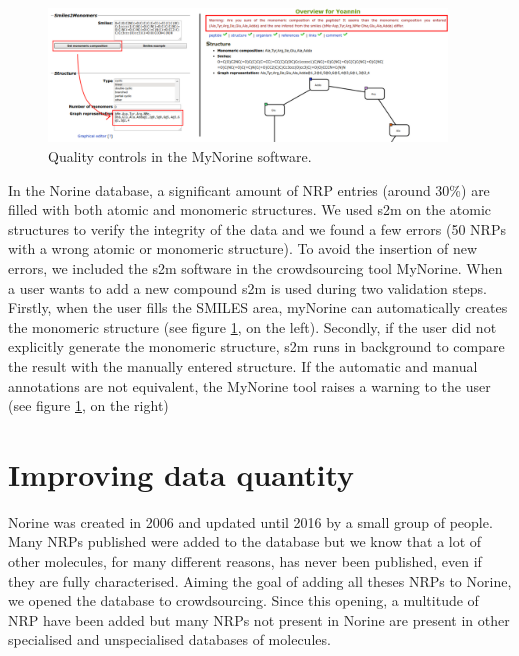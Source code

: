 \documentclass[long, final]{jobim2017}
\begin{document}
 \begin{figure}
   \begin{center}
     \includegraphics[width=400px]{figs/warnings.png}
   \end{center}
   \caption{Quality controls in the MyNorine software.}
   \label{fig:warnings}
 \end{figure}

In the Norine database, a significant amount of NRP entries (around 30\%) are filled with both atomic and monomeric structures.
We used s2m on the atomic structures to verify the integrity of the data and we found a few errors (50 NRPs with a wrong atomic or monomeric structure).
To avoid the insertion of new errors, we included the s2m software in the crowdsourcing tool MyNorine.
When a user wants to add a new compound s2m is used during two validation steps.
Firstly, when the user fills the SMILES area, myNorine can automatically creates the monomeric structure (see figure \ref{fig:warnings}, on the left).
Secondly, if the user did not explicitly generate the monomeric structure, s2m runs in background to compare the result with the manually entered structure.
If the automatic and manual annotations are not equivalent, the MyNorine tool raises a warning to the user (see figure \ref{fig:warnings}, on the right)


\section{Improving data quantity}

Norine was created in 2006 and updated until 2016 by a small group of people.
Many NRPs published were added to the database but we know that a lot of other molecules, for many different reasons, has never been published, even if they are fully characterised.
Aiming the goal of adding all theses NRPs to Norine, we opened the database to crowdsourcing.
Since this opening, a multitude of NRP have been added but many NRPs not present in Norine are present in other specialised and unspecialised databases of molecules.
\end{document}
